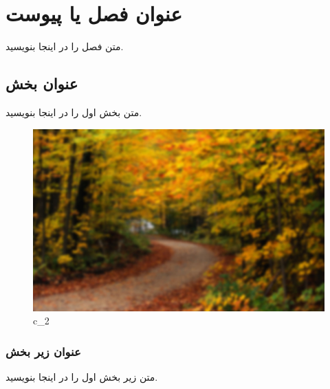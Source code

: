 \chapter{عنوان فصل یا پیوست}
متن فصل را در اینجا بنویسید.

\section{عنوان بخش }
متن بخش اول را در اینجا بنویسید.
\begin{figure}[H]
\centering
\includegraphics[scale=0.3]{chap1_images/sample.jpg}
\caption[c_1]{c_2}
\label{sample}
\end{figure}

\subsection{عنوان زیر بخش }
متن زیر بخش اول را در اینجا بنویسید.

